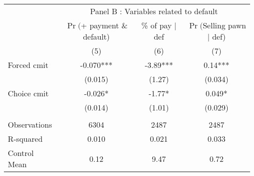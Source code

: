 \begin{tabular}{lccc}
\toprule
      & \multicolumn{3}{c}{Panel B  : Variables related to default} \\
\cmidrule{2-4}      & $\Pr($+ payment \& default) & \textcolor[rgb]{ .651,  .651,  .651}{\% of pay $|$ def } & \textcolor[rgb]{ .651,  .651,  .651}{$\Pr($Selling pawn $|$ def)} \\
\midrule
\midrule
      & (5)   & \textcolor[rgb]{ .651,  .651,  .651}{(6)} & \textcolor[rgb]{ .651,  .651,  .651}{(7)} \\
\midrule
\midrule
Forced cmit & -0.070*** & \textcolor[rgb]{ .651,  .651,  .651}{-3.89***} & \textcolor[rgb]{ .651,  .651,  .651}{0.14***} \\
      & (0.015) & \textcolor[rgb]{ .651,  .651,  .651}{(1.27)} & \textcolor[rgb]{ .651,  .651,  .651}{(0.034)} \\
Choice cmit & -0.026* & \textcolor[rgb]{ .651,  .651,  .651}{-1.77*} & \textcolor[rgb]{ .651,  .651,  .651}{0.049*} \\
      & (0.014) & \textcolor[rgb]{ .651,  .651,  .651}{(1.01)} & \textcolor[rgb]{ .651,  .651,  .651}{(0.029)} \\
      &       & \textcolor[rgb]{ .651,  .651,  .651}{} & \textcolor[rgb]{ .651,  .651,  .651}{} \\
\midrule
Observations & 6304  & \textcolor[rgb]{ .651,  .651,  .651}{2487} & \textcolor[rgb]{ .651,  .651,  .651}{2487} \\
R-squared & 0.010 & \textcolor[rgb]{ .651,  .651,  .651}{0.021} & \textcolor[rgb]{ .651,  .651,  .651}{0.033} \\
Control Mean & 0.12  & \textcolor[rgb]{ .651,  .651,  .651}{9.47} & \textcolor[rgb]{ .651,  .651,  .651}{0.72} \\
\bottomrule
\bottomrule
\end{tabular}%
